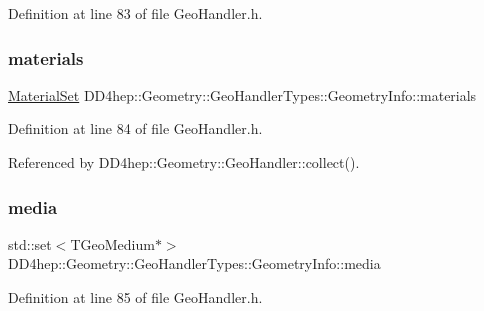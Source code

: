 Definition at line 83 of file Geo\+Handler.\+h.

\hypertarget{class_d_d4hep_1_1_geometry_1_1_geo_handler_types_1_1_geometry_info_a4a14f49297ddc460b835c6317ed757d9}{}\label{class_d_d4hep_1_1_geometry_1_1_geo_handler_types_1_1_geometry_info_a4a14f49297ddc460b835c6317ed757d9} 
\subsubsection{\texorpdfstring{materials}{materials}}
{\footnotesize\ttfamily \hyperlink{class_d_d4hep_1_1_geometry_1_1_geo_handler_types_a2cb3f04bc3529531d1559173eea5f7b5}{Material\+Set} D\+D4hep\+::\+Geometry\+::\+Geo\+Handler\+Types\+::\+Geometry\+Info\+::materials}



Definition at line 84 of file Geo\+Handler.\+h.



Referenced by D\+D4hep\+::\+Geometry\+::\+Geo\+Handler\+::collect().

\hypertarget{class_d_d4hep_1_1_geometry_1_1_geo_handler_types_1_1_geometry_info_a39bb8b651e878cdfeac6d0ef028734d8}{}\label{class_d_d4hep_1_1_geometry_1_1_geo_handler_types_1_1_geometry_info_a39bb8b651e878cdfeac6d0ef028734d8} 
\subsubsection{\texorpdfstring{media}{media}}
{\footnotesize\ttfamily std\+::set$<$T\+Geo\+Medium$\ast$$>$ D\+D4hep\+::\+Geometry\+::\+Geo\+Handler\+Types\+::\+Geometry\+Info\+::media}



Definition at line 85 of file Geo\+Handler.\+h.

\hypertarget{class_d_d4hep_1_1_geometry_1_1_geo_handler_types_1_1_geometry_info_a121f17ff08f77f9eda63a704648f8994}{}\label{class_d_d4hep_1_1_geometry_1_1_geo_handler_types_1_1_geometry_info_a121f17ff08f77f9eda63a704648f8994} 
